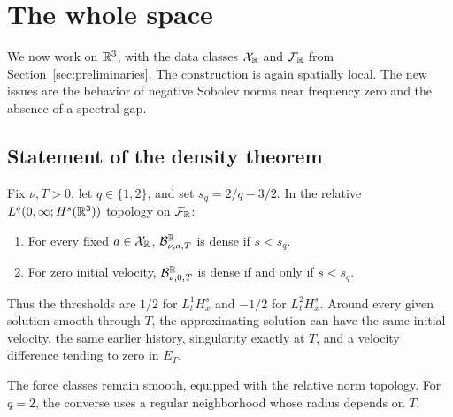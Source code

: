 \section{The whole space}\label{sec:whole}
We now work on $\mathbb R^3$, with the data classes $\mathcal X_{\mathbb R}$ and
$\mathcal F_{\mathbb R}$ from Section~\ref{sec:preliminaries}. The construction
is again spatially local. The new issues are the behavior of negative
Sobolev norms near frequency zero and the absence of a spectral gap.
\subsection{Statement of the density theorem}
\begin{theorem}\label{thm:Rmain}
Fix $\nu,T>0$, let $q\in\{1,2\}$, and set $s_q=2/q-3/2$. In the relative $L^q(0,\infty;H^s(\mathbb R^3))$ topology on $\mathcal F_{\mathbb R}$:
\begin{enumerate}[label=(\roman*),nosep]
\item For every fixed $a\in\mathcal X_{\mathbb R}$, $\mathcal B^\mathbb R_{\nu,a,T}$ is dense if $s<s_q$.
\item For zero initial velocity, $\mathcal B^\mathbb R_{\nu,0,T}$ is dense if and only if $s<s_q$.
\end{enumerate}
Thus the thresholds are $1/2$ for $L^1_tH^s_x$ and $-1/2$ for $L^2_tH^s_x$. Around every given solution smooth through $T$, the approximating solution can have the same initial velocity, the same earlier history, singularity exactly at $T$, and a velocity difference tending to zero in $E_T$.
\end{theorem}

The force classes remain smooth, equipped with the relative norm topology. For $q=2$, the converse uses a regular neighborhood whose radius depends on $T$.

